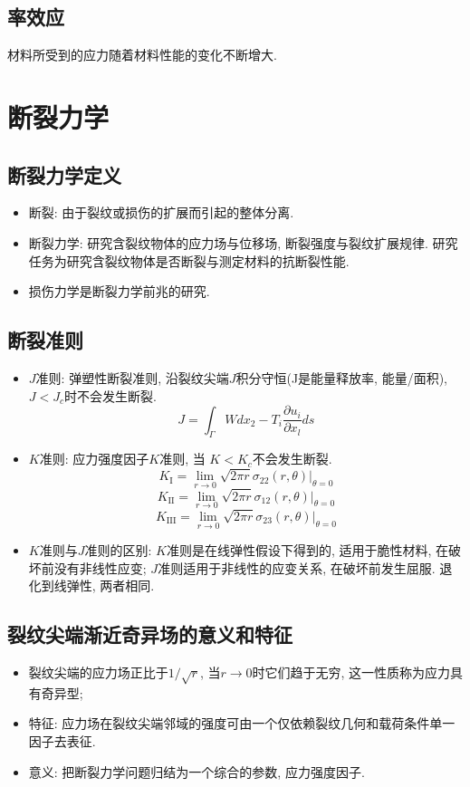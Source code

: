\documentclass[a4paper,titlepage,twocolumn]{article}
\begin{document}
\subsection{率效应}
材料所受到的应力随着材料性能的变化不断增大.


\section{断裂力学}
\subsection{断裂力学定义}
\begin{itemize}
\item 断裂: 由于裂纹或损伤的扩展而引起的整体分离.
\item 断裂力学: 研究含裂纹物体的应力场与位移场, 断裂强度与裂纹扩展规律. 研究任务为研究含裂纹物体是否断裂与测定材料的抗断裂性能.
\item 损伤力学是断裂力学前兆的研究.
\end{itemize}

\subsection{断裂准则}
\begin{itemize}
\item $J$准则: 弹塑性断裂准则, 沿裂纹尖端$J$积分守恒(J是能量释放率, 能量/面积), $J<J_c$时不会发生断裂.
\[
J = \int_\Gamma W dx_2 - T_i\frac{\partial u_i}{\partial x_l}ds
\]

\item $K$准则: 应力强度因子$K$准则, 当 $K<K_c$不会发生断裂.
\[
K_{\mathrm{I}} = \lim_{r\rightarrow 0}\sqrt{2\pi r}\sigma_{22}(r,\theta)\Big|_{\theta=0}
\]
\[
K_{\mathrm{II}} = \lim_{r\rightarrow 0}\sqrt{2\pi r}\sigma_{12}(r,\theta)\Big|_{\theta=0}
\]
\[
K_{\mathrm{III}} = \lim_{r\rightarrow 0}\sqrt{2\pi r}\sigma_{23}(r,\theta)\Big|_{\theta=0}
\]

\item $K$准则与$J$准则的区别: $K$准则是在线弹性假设下得到的, 适用于脆性材料, 在破坏前没有非线性应变; $J$准则适用于非线性的应变关系, 在破坏前发生屈服. 退化到线弹性, 两者相同.

\end{itemize}


\subsection{裂纹尖端渐近奇异场的意义和特征}
\begin{itemize}
\item 裂纹尖端的应力场正比于$1/\sqrt{r}$, 当$r\rightarrow 0$时它们趋于无穷, 这一性质称为应力具有奇异型;
\item 特征: 应力场在裂纹尖端邻域的强度可由一个仅依赖裂纹几何和载荷条件单一因子去表征.
\item 意义: 把断裂力学问题归结为一个综合的参数, 应力强度因子.
\end{itemize}
\end{document}
